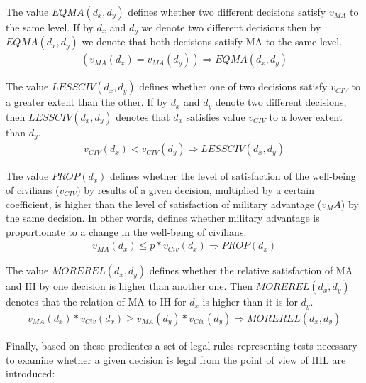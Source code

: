 \begin{ddefinition}
The value $EQMA(d_x,d_y)$ defines whether two different decisions satisfy $v_{MA}$ to the same level. If by $d_x$ and $d_y$ we denote two different decisions then by $EQMA(d_x,d_y)$ we denote that both decisions satisfy MA to the same level.
\begin{align*}
    (v_{MA}(d_x) = v_{MA}(d_y)) \Rightarrow EQMA(d_x,d_y)
\end{align*}
\end{ddefinition}
\begin{ddefinition}
The value $LESSCIV(d_x,d_y)$ defines whether one of two decisions satisfy $v_{CIV}$ to a greater extent than the other. If by $d_x$ and $d_y$ denote two different decisions, then $LESSCIV(d_x,d_y)$ denotes that $d_x$ satisfies value $v_{CIV}$ to a lower extent than $d_y$. 
\begin{align*}
v_{CIV}(d_x) < v_{CIV}(d_y) \Rightarrow LESSCIV(d_x,d_y)
\end{align*}
\end{ddefinition}
\begin{ddefinition}
\label{formula:proportionalityTest}
The value $PROP(d_x)$ defines whether the level of satisfaction of the well-being of civilians ($v_{CIV})$ by results of a given decision, multiplied by a certain coefficient, is higher than the level of satisfaction of military advantage ($v_MA$) by the same decision. In other words, defines whether military advantage is proportionate to a change in the well-being of civilians.
\begin{align*}
 v_{MA}(d_x) \leq p*v_{Civ}(d_x) \Rightarrow PROP(d_x)  
\end{align*}
\end{ddefinition}
\begin{ddefinition}
The value $MOREREL(d_x,d_y)$ defines whether the relative satisfaction of MA and IH by one decision is higher than another one. Then $MOREREL(d_x,d_y)$ denotes that the relation of MA to IH for $d_x$ is higher than it is for $d_y$.
\begin{align*}
v_{MA}(d_x)*v_{Civ}(d_x) \geq v_{MA}(d_y)*v_{Civ}(d_y) \Rightarrow MOREREL(d_x,d_y)   
\end{align*}
\end{ddefinition}


Finally, based on these predicates a set of legal rules representing tests necessary to examine whether a given decision is legal from the point of view of IHL are introduced:

